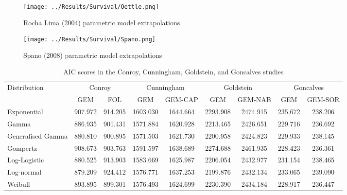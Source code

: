 \begin{figure}[h]
    \centering
    \texttt{[image: ../Results/Survival/Oettle.png]}
    \caption{Rocha Lima (2004) parametric model extrapolations}
    \label{fig:rochaLimaParamExtrap}
\end{figure}

\begin{figure}[h]
    \centering
    \texttt{[image: ../Results/Survival/Spano.png]}
    \caption{Spano (2008) parametric model extrapolations}
    \label{fig:spanoParamExtrap}
\end{figure}

\begin{table}[h]
    \centering
    \begin{tabular}{lcccccccc}
    \hline
    \multirow{2}{*}{Distribution} & \multicolumn{2}{c}{Conroy} & \multicolumn{2}{c}{Cunningham} & \multicolumn{2}{c}{Goldstein} & \multicolumn{2}{c}{Goncalves} \\ \cline{2-9} 
                                  & GEM      & FOL          & GEM            & GEM-CAP       & GEM           & GEM-NAB       & GEM           & GEM-SOR       \\ \hline
    Exponential                   & 907.972  & 914.205      & 1603.030       & 1644.664      & 2293.908      & 2474.915      & 235.672       & 238.206       \\
    Gamma                         & 886.935  & 901.431      & 1571.884       & 1620.928      & 2213.465      & 2426.651      & 229.716       & 236.692       \\
    Generalised Gamma             & 880.810  & 900.895      & 1571.503       & 1621.730      & 2200.958      & 2424.823      & 229.933       & 238.145       \\
    Gompertz                      & 908.673  & 903.763      & 1591.597       & 1638.689      & 2274.688      & 2461.935      & 228.423       & 236.361       \\
    Log-Logistic                  & 880.525  & 913.903      & 1583.669       & 1625.987      & 2206.054      & 2432.977      & 231.154       & 238.465       \\
    Log-normal                    & 879.209  & 924.412      & 1576.771       & 1637.253      & 2199.876      & 2432.134      & 233.065       & 239.090       \\
    Weibull                       & 893.895  & 899.301      & 1576.493       & 1624.699      & 2230.390      & 2434.184      & 228.917       & 236.447       \\ \hline
    \end{tabular}
    \caption{AIC scores in the Conroy, Cunningham, Goldstein, and Goncalves studies}
    \label{AIC1}
\end{table}

